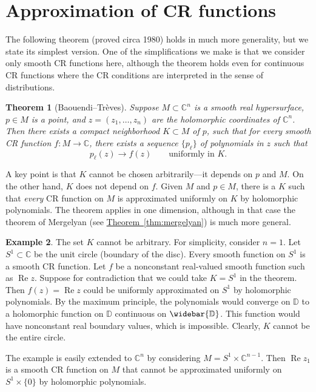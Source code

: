 \documentclass[12pt,openany]{book}
\renewcommand{\Re}{\operatorname{Re}}
\newcommand{\C}{{\mathbb{C}}}
\newcommand{\D}{{\mathbb{D}}}
\theoremstyle{plain}
\newtheorem{thm}{Theorem}[section]
\theoremstyle{remark}
\theoremstyle{definition}
\theoremstyle{exercise}
\theoremstyle{example}
\newtheorem{example}[thm]{Example}
\newcommand{\thmref}[1]{\hyperref[#1]{Theorem~\ref*{#1}}}
\begin{document}
\section{Approximation of CR functions}

The following theorem (proved circa 1980) holds in much more generality, but
we state its simplest version.  One of the simplifications we make is that
we consider only smooth CR functions here, although the theorem holds even
for continuous CR functions where the CR conditions are interpreted in the
sense of distributions.

\begin{thm}[Baouendi--Tr{\`e}ves]%
\pagebreak[2]
Suppose $M \subset \C^n$ is a smooth real hypersurface,
$p \in M$ is a point,
and
$z=(z_1,\dots,z_n)$ are the holomorphic coordinates of $\C^n$.
Then there exists a compact
neighborhood $K \subset M$ of $p$, such that for every smooth CR function $f \colon M \to \C$,
there exists a sequence $\{ p_\ell \}$ of polynomials in $z$ such that
\begin{equation*}
p_\ell(z) \to f(z)
\qquad \text{uniformly in $K$.}
\end{equation*}
\end{thm}

A key point is that $K$ cannot be chosen arbitrarily---it depends on $p$ and $M$.
On the other hand, $K$ does not depend on $f$.  Given $M$ and $p \in M$,
there is a $K$ such that \emph{every} CR function on $M$ is approximated
uniformly on $K$ by holomorphic polynomials.  The theorem applies in one
dimension, although in that case the theorem of Mergelyan
(see \thmref{thm:mergelyan}) is much more general.

\begin{example}
The set $K$ cannot be arbitrary.  For simplicity, consider $n=1$.
Let $S^1 \subset \C$ be the unit circle (boundary of the disc).
Every smooth function on $S^1$ is a smooth CR function.  Let $f$
be a nonconstant real-valued smooth function such as $\Re z$.  Suppose for
contradiction that we could take $K = S^1$ in the theorem.  Then $f(z) = \Re
z$ could be uniformly
approximated on $S^1$ by holomorphic polynomials.
By the maximum principle, the
polynomials would converge on $\D$ to a holomorphic function on $\D$
continuous on $\widebar{\D}$.  This function would have nonconstant real boundary values,
which is impossible.  Clearly, $K$ cannot be the entire circle.

The example is easily extended to $\C^n$
by considering
$M = S^1 \times \C^{n-1}$.
Then $\Re z_1$ is a smooth CR function on $M$ that cannot be
approximated uniformly on $S^1 \times \{ 0 \}$ by holomorphic polynomials.
\end{example}
\end{document}
